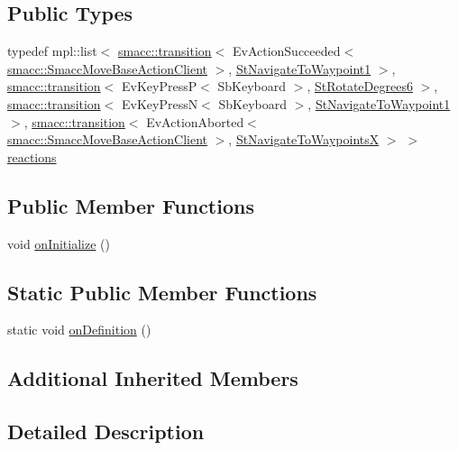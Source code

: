 \subsection*{Public Types}
\begin{DoxyCompactItemize}
\item 
typedef mpl\+::list$<$ \hyperlink{classsmacc_1_1transition}{smacc\+::transition}$<$ Ev\+Action\+Succeeded$<$ \hyperlink{classsmacc_1_1SmaccMoveBaseActionClient}{smacc\+::\+Smacc\+Move\+Base\+Action\+Client} $>$, \hyperlink{structStNavigateToWaypoint1}{St\+Navigate\+To\+Waypoint1} $>$, \hyperlink{classsmacc_1_1transition}{smacc\+::transition}$<$ Ev\+Key\+PressP$<$ Sb\+Keyboard $>$, \hyperlink{structStRotateDegrees6}{St\+Rotate\+Degrees6} $>$, \hyperlink{classsmacc_1_1transition}{smacc\+::transition}$<$ Ev\+Key\+PressN$<$ Sb\+Keyboard $>$, \hyperlink{structStNavigateToWaypoint1}{St\+Navigate\+To\+Waypoint1} $>$, \hyperlink{classsmacc_1_1transition}{smacc\+::transition}$<$ Ev\+Action\+Aborted$<$ \hyperlink{classsmacc_1_1SmaccMoveBaseActionClient}{smacc\+::\+Smacc\+Move\+Base\+Action\+Client} $>$, \hyperlink{structStNavigateToWaypointsX}{St\+Navigate\+To\+WaypointsX} $>$ $>$ \hyperlink{structStNavigateReverse3_a3c6aa4d7f782878480f9eb418681c585}{reactions}
\end{DoxyCompactItemize}
\subsection*{Public Member Functions}
\begin{DoxyCompactItemize}
\item 
void \hyperlink{structStNavigateReverse3_a4cbaaac42b28f996e98d6b50a9527a89}{on\+Initialize} ()
\end{DoxyCompactItemize}
\subsection*{Static Public Member Functions}
\begin{DoxyCompactItemize}
\item 
static void \hyperlink{structStNavigateReverse3_a1b9dbbca7ffdcaa19799f0792ca5592a}{on\+Definition} ()
\end{DoxyCompactItemize}
\subsection*{Additional Inherited Members}


\subsection{Detailed Description}


